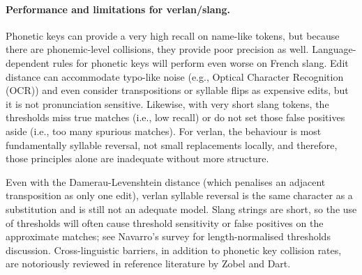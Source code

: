 \documentclass[12pt]{article}
\begin{document}
\paragraph{Performance and limitations for verlan/slang.} Phonetic keys can provide a very high recall on name-like tokens, but because there are phonemic-level collisions, they provide poor precision as well. Language-dependent rules for phonetic keys will perform even worse on French slang. Edit distance can accommodate typo-like noise (e.g., Optical Character Recognition (OCR)) and even consider transpositions or syllable flips as expensive edits, but it is not pronunciation sensitive.  Likewise, with very short slang tokens, the thresholds miss true matches (i.e., low recall) or do not set those false positives aside (i.e., too many spurious matches). For verlan, the behaviour is most fundamentally syllable reversal, not small replacements locally, and therefore, those principles alone are inadequate without more structure. 

Even with the Damerau-Levenshtein distance (which penalises an adjacent transposition as only one edit), verlan syllable reversal is the same character as a substitution and is still not an adequate model. Slang strings are short, so the use of thresholds will often cause threshold sensitivity or false positives on the approximate matches; see Navarro's survey for length-normalised thresholds discussion. Cross-linguistic barriers, in addition to phonetic key collision rates, are notoriously reviewed in reference literature by Zobel and Dart. \cite{damerau1964,navarro2001approximate,zobel1996phonetic}


\begin{table}[H]
\centering
{}
\caption{Classical fuzzy-match methods: strengths and limitations for slang/verlan.}
\label{tab:fuzzy_perf}
\end{table}
\end{document}
